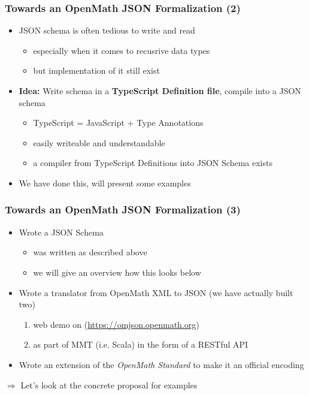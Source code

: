 \documentclass[usenames,dvipsnames]{beamer}
\begin{document}
\begin{frame}
    \frametitle{Towards an OpenMath JSON Formalization (2)}
    \begin{itemize}
        \item JSON schema is often tedious to write and read
        \begin{itemize}
            \item especially when it comes to recusrive data types
            \item but implementation of it still exist 
        \end{itemize}
        \item \textbf{Idea:} Write schema in a \textbf{TypeScript Definition file}, compile into a JSON schema
        \begin{itemize}
            \item TypeScript = JavaScript + Type Annotations
            \item easily writeable and understandable
            \item a compiler from TypeScript Definitions into JSON Schema exists
        \end{itemize}
        \item We have done this, will present some examples
    \end{itemize}
\end{frame}

\begin{frame}
    \frametitle{Towards an OpenMath JSON Formalization (3)}
    \begin{itemize}
        \item Wrote a JSON Schema
        \begin{itemize}
            \item was written as described above
            \item we will give an overview how this looks below
        \end{itemize}
        \item Wrote a translator from OpenMath XML to JSON (we have actually built two)
        \begin{enumerate}
            \item web demo on (\url{https://omjson.openmath.org})
            \item as part of MMT (i.e. Scala) in the form of a RESTful API
        \end{enumerate}
        \item Wrote an extension of the \textit{OpenMath Standard} to make it an official encoding
    \end{itemize}
\end{frame}

\begin{frame}[fragile]
    $\Rightarrow$ Let's look at the concrete proposal for examples
\end{frame}
\end{document}
